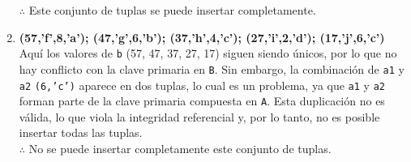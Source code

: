 \begin{enumerate}
    $\therefore$ Este conjunto de tuplas se puede insertar completamente.

    \item \textbf{(57,’f’,8,’a’); (47,’g’,6,’b’); (37,’h’,4,’c’); (27,’i’,2,’d’); (17,’j’,6,’c’)} \\
    
    Aquí los valores de \texttt{b} (57, 47, 37, 27, 17) siguen siendo únicos, por lo que no hay conflicto con la clave primaria en \texttt{B}. Sin embargo, la combinación de \texttt{a1} y \texttt{a2} \texttt{(6,'c')} aparece en dos tuplas, lo cual es un problema, ya que \texttt{a1} y \texttt{a2} forman parte de la clave primaria compuesta en \texttt{A}. Esta duplicación no es válida, lo que viola la integridad referencial y, por lo tanto, no es posible insertar todas las tuplas. \\

    $\therefore$ No se puede insertar completamente este conjunto de tuplas.
\end{enumerate}
